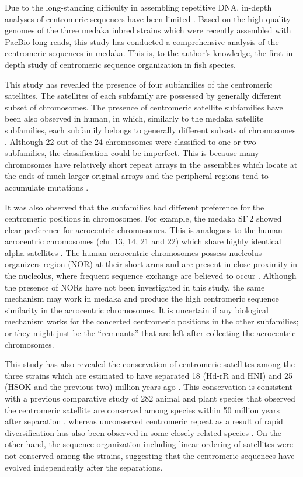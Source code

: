 Due to the long-standing difficulty in assembling repetitive DNA, in-depth analyses of centromeric sequences have been limited \cite{Plohl2014}. Based on the high-quality genomes of the three medaka inbred strains which were recently assembled with PacBio long reads, this study has conducted a comprehensive analysis of the centromeric sequences in medaka. This is, to the author's knowledge, the first in-depth study of centromeric sequence organization in fish species.

This study has revealed the presence of four subfamilies of the centromeric satellites. The satellites of each subfamily are possessed by generally different subset of chromosomes. The presence of centromeric satellite subfamilies have been also observed in human, in which, similarly to the medaka satellite subfamilies, each subfamily belongs to generally different subsets of chromosomes \cite{Alexandrov2001}. Although 22 out of the 24 chromosomes were classified to one or two subfamilies, the classification could be imperfect. This is because many chromosomes have relatively short repeat arrays in the assemblies which locate at the ends of much larger original arrays and the peripheral regions tend to accumulate mutations \cite{Smith1976, Schueler2001}.

It was also observed that the subfamilies had different preference for the centromeric positions in chromosomes. For example, the medaka SF\,2 showed clear preference for acrocentric chromosomes. This is analogous to the human acrocentric chromosomes (chr.\,13, 14, 21 and 22) which share highly identical alpha-satellites \cite{Willard1991}. The human acrocentric chromosomes possess nucleolus organizers region (NOR) at their short arms and are present in close proximity in the nucleolus, where frequent sequence exchange are believed to occur \cite{Willard1991}. Although the presence of NORs have not been investigated in this study, the same mechanism may work in medaka and produce the high centromeric sequence similarity in the acrocentric chromosomes. It is uncertain if any biological mechanism works for the concerted centromeric positions in the other subfamilies; or they might just be the ``remnants'' that are left after collecting the acrocentric chromosomes.

This study has also revealed the conservation of centromeric satellites among the three strains which are estimated to have separated 18 (Hd-rR and HNI) and 25 (HSOK and the previous two) million years ago \cite{Setiamarga2009}. This conservation is consistent with a previous comparative study of 282 animal and plant species that observed the centromeric satellite are conserved among species within 50 million years after separation \cite{Melters2013}, whereas unconserved centromeric repeat as a result of rapid diversification has also been observed in some closely-related species \cite{Lee2005}. On the other hand, the sequence organization including linear ordering of satellites were not conserved among the strains, suggesting that the centromeric sequences have evolved independently after the separations.

